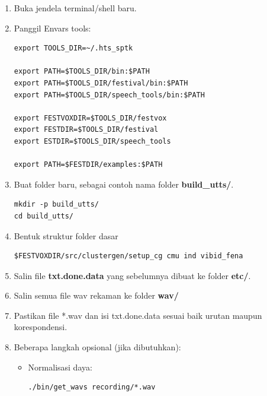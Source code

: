 \documentclass[12pt,]{article}
\begin{document}
	\begin{enumerate}
		\item Buka jendela terminal/shell baru.
		
		\item Panggil Envars tools:
		\begin{verbatim}
export TOOLS_DIR=~/.hts_sptk

export PATH=$TOOLS_DIR/bin:$PATH
export PATH=$TOOLS_DIR/festival/bin:$PATH
export PATH=$TOOLS_DIR/speech_tools/bin:$PATH

export FESTVOXDIR=$TOOLS_DIR/festvox
export FESTDIR=$TOOLS_DIR/festival
export ESTDIR=$TOOLS_DIR/speech_tools

export PATH=$FESTDIR/examples:$PATH
		\end{verbatim}
		
		\item Buat folder baru, sebagai contoh nama folder \textbf{build\_utts/}.
		\begin{verbatim}
mkdir -p build_utts/
cd build_utts/
		\end{verbatim}
		
		\item Bentuk struktur folder dasar
		\begin{verbatim}
$FESTVOXDIR/src/clustergen/setup_cg cmu ind vibid_fena
		\end{verbatim}
		
		\item Salin file \textbf{txt.done.data} yang sebelumnya dibuat ke folder \textbf{etc/}.
		
		\item Salin semua file wav rekaman ke folder \textbf{wav/}
		
		\item Pastikan file *.wav dan isi txt.done.data sesuai baik urutan maupun korespondensi.
		
		\item Beberapa langkah opsional (jika dibutuhkan):
		
		\begin{itemize}
			\item Normalisasi daya:
			\begin{verbatim}
./bin/get_wavs recording/*.wav
			\end{verbatim}
			

\end{itemize}
\end{enumerate}
\end{document}
